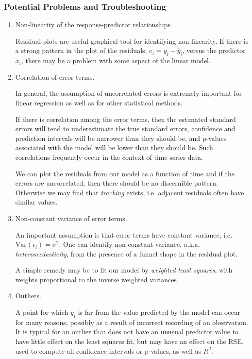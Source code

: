\documentclass{article}
\numberwithin{equation}{section}
\begin{document}
\subsubsection{Potential Problems and Troubleshooting}
\begin{enumerate}
    \item Non-linearity of the response-predictor relationships.
    
        Residual plots are useful graphical tool for identifying non-linearity. If there is a strong pattern in the  plot of the residuals, $e_i = y_i - \hat y_i$, versus the predictor $x_i$, there may be a problem with some aspect of the linear model.
    
    \item Correlation of error terms.
    
         In general, the assumption of uncorrelated errors is extremely important for linear regression as well as for other statistical methods.
        
        If there is correlation among the error terms, then the estimated standard errors will tend to underestimate the true standard errors, confidence and prediction intervals will be narrower than they should be, and p-values associated with the model will be lower than they should be.  Such correlations frequently occur in the context of time series data.
        
        We can plot the residuals from our model as a function of time and if the errors are uncorrelated, then there should be no discernible pattern. Otherwise we may find that \textit{tracking} exists, i.e. adjacent residuals often have similar values.
    
    \item Non-constant variance of error terms.
        
        An important assumption is that error terms have constant variance, i.e. $ \text{Var}(\epsilon_i) = \sigma^2$.  One can identify non-constant variance, a.k.a. \textit{heteroscedasticity}, from the presence of a funnel shape in the residual plot.
        
        A simple remedy may be to fit our model by \textit{weighted least squares}, with weights proportional to the inverse weighted variances.
    
    \item Outliers.
    
    A point for which $y_i$ is far from the value predicted by the model can occur for many reasons, possibly as a result  of incorrect recording of an observation.
    It is typical for an outlier that does not have an unusual predictor value to have little effect on the least squares fit, but may have an effect on the RSE, used to compute all confidence intervals or p-values, as well as $R^2$. 
    

\end{enumerate}
\end{document}
